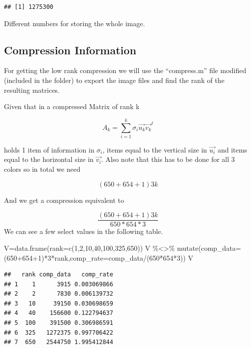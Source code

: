\documentclass[
]{article}
\newenvironment{Shaded}{\begin{snugshade}}{\end{snugshade}}
\newcommand{\AttributeTok}[1]{\textcolor[rgb]{0.77,0.63,0.00}{#1}}
\newcommand{\DecValTok}[1]{\textcolor[rgb]{0.00,0.00,0.81}{#1}}
\newcommand{\FunctionTok}[1]{\textcolor[rgb]{0.00,0.00,0.00}{#1}}
\newcommand{\NormalTok}[1]{#1}
\newcommand{\OtherTok}[1]{\textcolor[rgb]{0.56,0.35,0.01}{#1}}
\newcommand{\SpecialCharTok}[1]{\textcolor[rgb]{0.00,0.00,0.00}{#1}}
\begin{document}
\begin{verbatim}
## [1] 1275300
\end{verbatim}

Different numbers for storing the whole image.

\hypertarget{compression-information}{%
\subsection{Compression Information}\label{compression-information}}

For getting the low rank compression we will use the ``compress.m'' file
modified (included in the folder) to export the image files and find the
rank of the resulting matrices.

Given that in a compressed Matrix of rank k

\[
A_k=\sum_{i=1}^k\sigma_i \vec{u_k}\vec{v_k}^t
\]

holds 1 item of information in \(\sigma_i\), items equal to the vertical
size in \(\vec{u_i}\) and items equal to the horizontal size in
\(\vec{v_i}\). Also note that this has to be done for all 3 colors so in
total we need

\[
(650+654+1)3k
\]

And we get a compression equivalent to

\[
\frac{(650+654+1)3k}{650*654*3}
\] We can see a few select values in the following table.

\begin{Shaded}
\begin{Highlighting}[]
\NormalTok{V}\OtherTok{=}\FunctionTok{data.frame}\NormalTok{(}\AttributeTok{rank=}\FunctionTok{c}\NormalTok{(}\DecValTok{1}\NormalTok{,}\DecValTok{2}\NormalTok{,}\DecValTok{10}\NormalTok{,}\DecValTok{40}\NormalTok{,}\DecValTok{100}\NormalTok{,}\DecValTok{325}\NormalTok{,}\DecValTok{650}\NormalTok{))}
\NormalTok{V }\SpecialCharTok{\%\textless{}\textgreater{}\%} \FunctionTok{mutate}\NormalTok{(}\AttributeTok{comp\_data=}\NormalTok{(}\DecValTok{650}\SpecialCharTok{+}\DecValTok{654}\SpecialCharTok{+}\DecValTok{1}\NormalTok{)}\SpecialCharTok{*}\DecValTok{3}\SpecialCharTok{*}\NormalTok{rank,}\AttributeTok{comp\_rate=}\NormalTok{comp\_data}\SpecialCharTok{/}\NormalTok{(}\DecValTok{650}\SpecialCharTok{*}\DecValTok{654}\SpecialCharTok{*}\DecValTok{3}\NormalTok{))}
\NormalTok{V}
\end{Highlighting}
\end{Shaded}

\begin{verbatim}
##   rank comp_data   comp_rate
## 1    1      3915 0.003069866
## 2    2      7830 0.006139732
## 3   10     39150 0.030698659
## 4   40    156600 0.122794637
## 5  100    391500 0.306986591
## 6  325   1272375 0.997706422
## 7  650   2544750 1.995412844
\end{verbatim}
\end{document}
